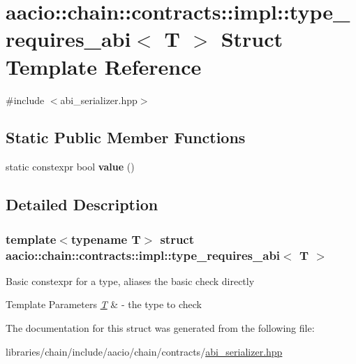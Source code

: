 \hypertarget{structaacio_1_1chain_1_1contracts_1_1impl_1_1type__requires__abi}{}\section{aacio\+:\+:chain\+:\+:contracts\+:\+:impl\+:\+:type\+\_\+requires\+\_\+abi$<$ T $>$ Struct Template Reference}
\label{structaacio_1_1chain_1_1contracts_1_1impl_1_1type__requires__abi}


{\ttfamily \#include $<$abi\+\_\+serializer.\+hpp$>$}

\subsection*{Static Public Member Functions}
\begin{DoxyCompactItemize}
\item 
\mbox{\label{structaacio_1_1chain_1_1contracts_1_1impl_1_1type__requires__abi_afee75eae7a177da3fcda09f9afb995a9}} 
static constexpr bool {\bfseries value} ()
\end{DoxyCompactItemize}


\subsection{Detailed Description}
\subsubsection*{template$<$typename T$>$\newline
struct aacio\+::chain\+::contracts\+::impl\+::type\+\_\+requires\+\_\+abi$<$ T $>$}

Basic constexpr for a type, aliases the basic check directly 
\begin{DoxyTemplParams}{Template Parameters}
{\em \mbox{\hyperlink{struct_t}{T}}} & -\/ the type to check \\
\hline
\end{DoxyTemplParams}


The documentation for this struct was generated from the following file\+:\begin{DoxyCompactItemize}
\item 
libraries/chain/include/aacio/chain/contracts/\mbox{\hyperlink{abi__serializer_8hpp}{abi\+\_\+serializer.\+hpp}}\end{DoxyCompactItemize}
